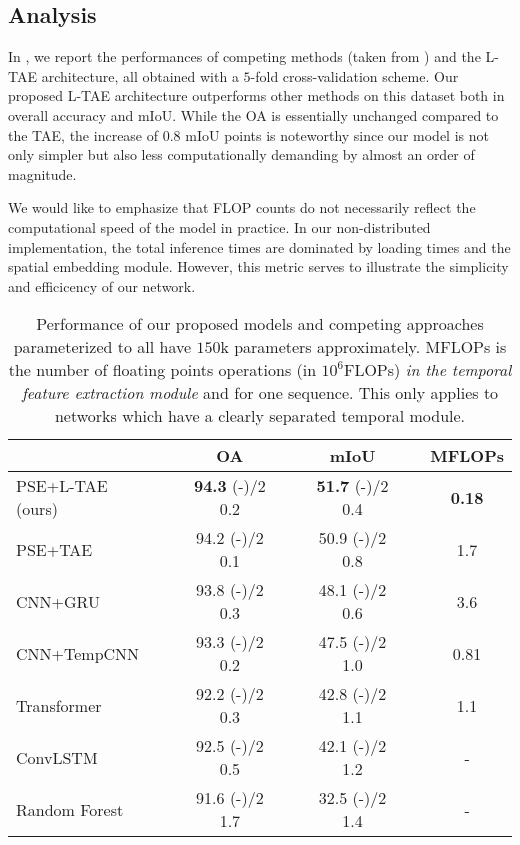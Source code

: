 \documentclass[runningheads]{llncs}
\newcommand{\rpm}{\sbox0{$1$}\sbox2{$\scriptstyle\pm$}
 \raise\dimexpr(\ht0-\ht2)/2\relax\box2 }
\begin{document}
\subsection{Analysis}
In , we report the performances of competing methods (taken from \cite{garnot2019satellite}) and the L-TAE architecture, all obtained with a $5$-fold cross-validation scheme.
Our proposed L-TAE architecture outperforms other methods on this dataset both in overall accuracy and mIoU. 
While the OA is essentially unchanged compared to the TAE, the increase of $0.8$ mIoU points is noteworthy since our model is not only simpler but also less computationally demanding by almost an order of magnitude.

We would like to emphasize that FLOP counts do not necessarily reflect the computational speed  of the model in practice. In our non-distributed implementation, the total inference times are dominated by loading times and the spatial embedding module. However, this metric serves to illustrate the simplicity and efficicency of our network.
\begin{table}[h!]
\caption{Performance of our proposed models and competing approaches parameterized to all have $150$k parameters approximately. MFLOPs is the number of floating points operations (in $10^6$FLOPs) \emph{in the temporal feature extraction module} and for one sequence. This only applies to networks which have a clearly separated temporal module.}
\begin{center}
\begin{tabular}{lcccccc}
 &\phantom{abc}& OA   &\phantom{abc}&mIoU & \phantom{abc} &MFLOPs   \\\toprule
PSE+L-TAE (ours) && \textbf{94.3}  \footnotesize{\rpm 0.2}  & &\textbf{51.7} \footnotesize{\rpm 0.4} && \bf 0.18\\
PSE+TAE \cite{garnot2019satellite}                   & &94.2 \footnotesize{\rpm 0.1}  &&  50.9  \footnotesize{\rpm 0.8}    && 1.7 \\ CNN+GRU  \cite{garnot2019time}                  && 93.8 \footnotesize{\rpm 0.3}    &&   48.1  \footnotesize{\rpm 0.6} && 3.6   \\CNN+TempCNN \cite{pelletier2019temporal}        && 93.3\footnotesize{\rpm 0.2}    &&   47.5\footnotesize{\rpm 1.0} && 0.81\\ Transformer \cite{russwurm2019self}                    &&  92.2 \footnotesize{\rpm 0.3 }  &&  42.8  \footnotesize{\rpm  1.1} && 1.1\\
ConvLSTM  \cite{russwurm2018convolutional}     & & 92.5\footnotesize{\rpm 0.5}    &&   42.1\footnotesize{\rpm 1.2} && - \\Random Forest \cite{bailly2018crop}        && 91.6\footnotesize{\rpm 1.7}   && 32.5  \footnotesize{\rpm 1.4} && - \\\bottomrule
\end{tabular}
\end{center}
\vspace{-.39cm}
\label{tab:perf_classif}
\centering
\end{table}
\end{document}
